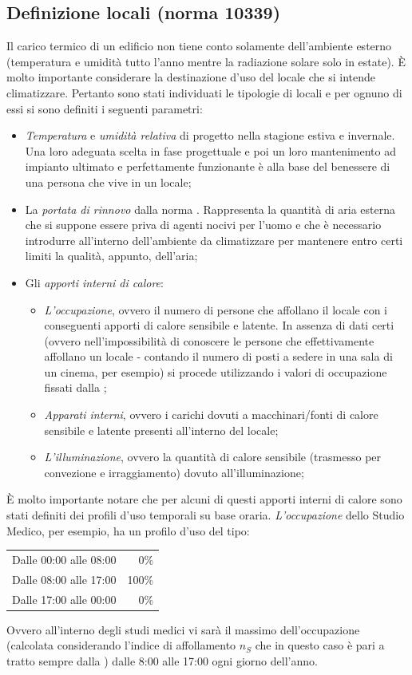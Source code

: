 \subsection{Definizione locali (norma 10339)}
Il carico termico di un edificio non tiene conto solamente dell'ambiente esterno (temperatura e umidità tutto l'anno mentre la radiazione solare solo in estate). È molto importante considerare la destinazione d'uso del locale che si intende climatizzare. Pertanto sono stati individuati le tipologie di locali e per ognuno di essi si sono definiti i seguenti parametri:
\begin{itemize}
	\item \emph{Temperatura} e \emph{umidità relativa} di progetto nella stagione estiva e invernale. Una loro adeguata scelta in fase progettuale e poi un loro mantenimento ad impianto ultimato e perfettamente funzionante è alla base del benessere di una persona che vive in un locale;
	\item La \emph{portata di rinnovo} dalla norma \norvent. Rappresenta la quantità di aria esterna che si suppone essere priva di agenti nocivi per l'uomo e che è necessario introdurre all'interno dell'ambiente da climatizzare per mantenere entro certi limiti la qualità, appunto, dell'aria;
	\item Gli \emph{apporti interni di calore}:
	\begin{itemize}
		\item \emph{L'occupazione}, ovvero il numero di persone che affollano il locale con i conseguenti apporti di calore sensibile e latente. In assenza di dati certi (ovvero nell'impossibilità di conoscere le persone che effettivamente affollano un locale - contando il numero di posti a sedere in una sala di un cinema, per esempio) si procede utilizzando i valori di occupazione fissati dalla \norvent;
		\item \emph{Apparati interni}, ovvero i carichi dovuti a macchinari/fonti di calore sensibile e latente presenti all'interno del locale;
		\item \emph{L'illuminazione}, ovvero la quantità di calore sensibile (trasmesso per convezione e irraggiamento) dovuto all'illuminazione;
	\end{itemize}
\end{itemize}
È molto importante notare che per alcuni di questi apporti interni di calore sono stati definiti dei profili d'uso temporali su base oraria. \emph{L'occupazione} dello Studio Medico, per esempio, ha un profilo d'uso del tipo:
\begin{center}
	\begin{tabular}{lr}
		\toprule
		Dalle 00:00 alle 08:00 & 0\% \\
		Dalle 08:00 alle 17:00 & 100\% \\
		Dalle 17:00 alle 00:00 & 0\% \\
		\bottomrule
	\end{tabular}
\end{center}
Ovvero all'interno degli studi medici vi sarà il massimo dell'occupazione (calcolata considerando l'indice di affollamento $n_S$ che in questo caso è pari a  tratto sempre dalla \norvent) dalle 8:00 alle 17:00 ogni giorno dell'anno.

